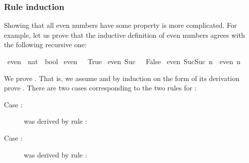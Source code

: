 \begin{isabellebody}
\begin{isamarkuptext}
\subsubsection{Rule induction}

Showing that all even numbers have some property is more complicated.  For
example, let us prove that the inductive definition of even numbers agrees
with the following recursive one:%
\end{isamarkuptext}%
\isamarkuptrue%
\isamarkupfalse%
\ even\ {}{}\ {}nat\ {}\ bool{}\ \isanewline
{}even\ {}\ {}\ True{}\ {}\isanewline
{}even\ {}Suc\ {}{}\ {}\ False{}\ {}\isanewline
{}even\ {}Suc{}Suc\ n{}{}\ {}\ even\ n{}%
\begin{isamarkuptext}%
We prove .  That is, we
assume  and by induction on the form of its derivation
prove . There are two cases corresponding to the two rules
for :
\begin{description}
\item[Case :]
  was derived by rule : \\
    
\item[Case :]
  was derived by rule : \\

\end{description}
\end{isamarkuptext}
\end{isabellebody}
